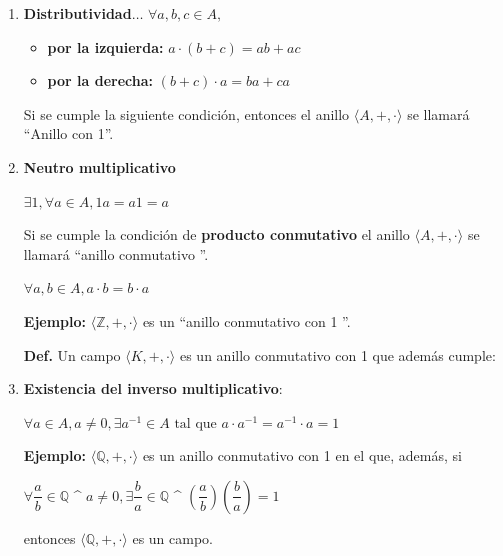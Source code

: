 \documentclass[12pt]{article}
\begin{document}
\begin{enumerate}
    \newpage
    \item \textbf{Distributividad$\dots$} \newline 
        $\forall a,b,c \in A,$
        \begin{itemize}
            \item \textbf{por la izquierda:} $a\cdot( b + c) = ab+ac$
            \item \textbf{por la derecha:}  $( b + c)\cdot a = ba+ca$
        \end{itemize}
    Si se cumple la siguiente condición, entonces el anillo $\langle A,+,\cdot\rangle$ se llamará \textquotedblleft Anillo con 1\textquotedblright.
    \item \textbf{Neutro multiplicativo}
    \begin{center}
        $\exists{} 1, \forall a \in A, 1a=a1=a$
    \end{center}
    Si se cumple la condición de \textbf{producto conmutativo} el anillo $\langle  A,+,\cdot \rangle$ se llamará \textquotedblleft anillo conmutativo \textquotedblright. 
    \begin{center}
        $\forall a,b\in A, a\cdot b = b \cdot a$
    \end{center}
     \textbf{Ejemplo:} $\langle  \mathbb{Z}, +, \cdot \rangle$ es un \textquotedblleft anillo conmutativo con 1 \textquotedblright.

    \textbf{Def.} Un campo $\langle K, +, \cdot \rangle$ es un anillo conmutativo con 1 que además cumple:
    \item \textbf{Existencia del inverso multiplicativo}:
    \begin{center}
        $\forall a \in A, a\not = 0, \exists a^{-1}\in A \text{ tal que } a\cdot a^{-1}=a^{-1}\cdot a =1$
    \end{center}
    \textbf{Ejemplo:} $\langle \mathbb{Q}, +, \cdot \rangle$ es un anillo conmutativo con 1 en el que, además, si \newline
    \begin{center}
    $\forall\dfrac{a}{b}\in\mathbb{Q}$ \^{} $ a\not=0 ,\exists \dfrac{b}{a} \in \mathbb{Q}$ \^{} $\left( \dfrac{a}{b} \right)\left( \dfrac{b}{a} \right)=1$
    \end{center}
    entonces $\langle \mathbb{Q}, +, \cdot \rangle$ es un campo.
\end{enumerate}
\newpage
\end{document}
